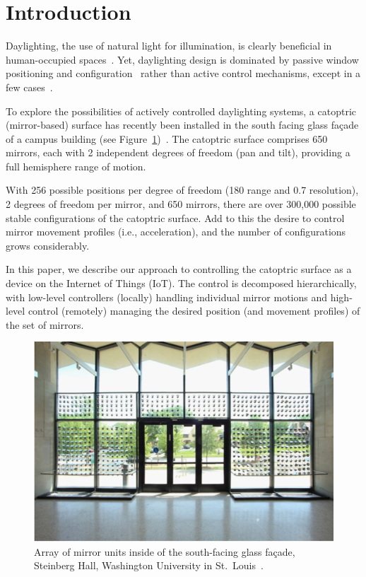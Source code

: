 \section{Introduction}
\label{sec:intro}

Daylighting, the use of natural light for illumination, is clearly
beneficial in human-occupied
spaces~\cite{hhm15,Leslie03}.
Yet, daylighting design is dominated by passive window positioning
and configuration~\cite{Leslie03} rather than active control mechanisms,
except in a few cases~\cite{kt16}.

To explore the possibilities of actively controlled daylighting systems,
a catoptric (mirror-based) surface has recently been installed in
the south facing glass fa\c cade of a campus building
(see Figure~\ref{fig:steinberg})~\cite{acadia18}.
The catoptric surface comprises 650 mirrors, each with 2 independent
degrees of freedom (pan and tilt), providing a full hemisphere
range of motion.

With 256 possible positions per degree of freedom (180\degree{} range
and 0.7\degree{} resolution), 2 degrees of freedom per mirror, and 650 mirrors, 
there are over 300,000 possible stable configurations of the catoptric surface.
Add to this the desire to control mirror movement profiles (i.e.,
acceleration), and the number of configurations grows considerably.

In this paper, we describe our approach to controlling the catoptric surface
as a device on the Internet of Things (IoT).
The control is decomposed hierarchically, with low-level controllers
(locally)
handling individual mirror motions and high-level control (remotely)
managing the
desired position (and movement profiles) of the set of mirrors.

\begin{figure}[ht]
\centering
\includegraphics[width=0.98\columnwidth]{steinberg}
\caption{Array of mirror units inside of the south-facing glass fa\c cade, Steinberg Hall, Washington University in St.~Louis~\protect\cite{acadia18}.}
\label{fig:steinberg}
\end{figure}


